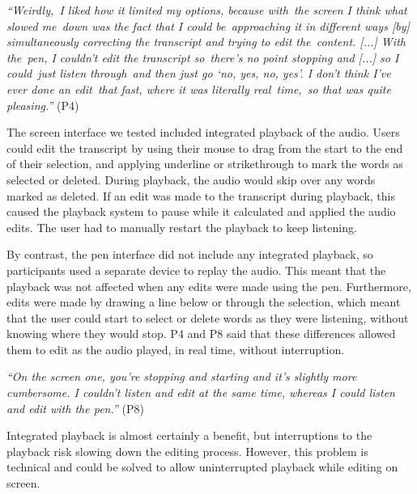 \textit{``Weirdly, I liked how it limited my options, because with the screen I think what slowed me down
  was the fact that I could be approaching it in different ways [by]
  simultaneously correcting the transcript and trying to edit the content. [...]
  With the pen, I couldn't edit the transcript so there's no point stopping and [...]
  so I could just listen through and then just go `no, yes, no, yes'.
  I don't think I've ever done an edit that fast, where it was literally real time, so that was quite pleasing.''} (P4)

The screen interface we tested included integrated playback of the audio. Users could edit the transcript by using
their mouse to drag from the start to the end of their selection, and applying underline or strikethrough to mark the
words as selected or deleted. During playback, the audio would skip over any words marked as deleted.  If an edit was
made to the transcript during playback, this caused the playback system to pause while it calculated and applied the
audio edits.  The user had to manually restart the playback to keep listening.

By contrast, the pen interface did not include any integrated playback, so participants used a separate device to
replay the audio. This meant that the playback was not affected when any edits were made using the pen. Furthermore,
edits were made by drawing a line below or through the selection, which meant that the user could start to select or
delete words as they were listening, without knowing where they would stop.  P4 and P8 said that these differences
allowed them to edit as the audio played, in real time, without interruption.

\textit{``On the screen one, you're stopping and starting and it's slightly more cumbersome. I couldn't listen and edit
at the same time, whereas I could listen and edit with the pen.''} (P8)

Integrated playback is almost certainly a benefit, but interruptions to the playback risk slowing down the editing
process. However, this problem is technical and could be solved to allow uninterrupted playback while editing on screen.


